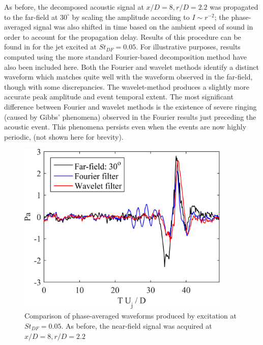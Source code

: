As before, the decomposed acoustic signal at $x/D = 8, r/D = 2.2$ was propagated to the far-field at $30^\circ$ by scaling the amplitude according to $I \sim r^{-2}$; the phase-averaged signal was also shifted in time based on the ambient speed of sound in order to account for the propagation delay. 
Results of this procedure can be found in  for the jet excited at $St_{DF} = 0.05$. 
For illustrative purposes, results computed using the more standard Fourier-based decomposition method have also been included here.
Both the Fourier and wavelet methods identify a distinct waveform which matches quite well with the waveform observed in the far-field, though with some discrepancies. 
The wavelet-method produces a slightly more accurate peak amplitude and event temporal extent. 
The most significant difference between Fourier and wavelet methods is the existence of severe ringing (caused by Gibbs’ phenomena) observed in the Fourier results just preceding the acoustic event. 
This phenomena persists even when the events are now highly periodic, (not shown here for brevity). 
\begin{figure}
	\centering
	\includegraphics[width=4in]{Figures/ch3_validation_phavg.png}
	\caption{Comparison of phase-averaged waveforms produced by excitation at $St_{DF} = 0.05$. As before, the near-field signal was acquired at $x/D = 8, r/D = 2.2$}
	\label{fig:ch3_validation_phavg}
\end{figure}

